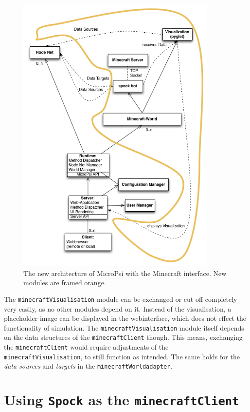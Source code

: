 \begin{figure}[h]
  \centering
    \includegraphics[width=10cm]{graphics/UML_MicroPsi_mit_spock_und_rahmen}
  \caption{The new architecture of MicroPsi with the Minecraft interface. New modules are framed orange.}
  \label{uml_mc}
\end{figure}

The \texttt{minecraftVisualisation} module can be exchanged or cut off completely very easily, as no other modules depend on it. Instead of the visualisation, a placeholder image can be displayed in the webinterface, which does not effect the functionality of simulation. The \texttt{minecraftVisualisation} module itself depends on the data structures of the \texttt{minecraftClient} though. This means, exchanging the \texttt{minecraftClient} would require adjustments of the \texttt{minecraftVisualisation}, to still function as intended. The same holds for the \emph{data sources} and \emph{targets} in the \texttt{minecraftWorldadapter}.

    \section{Using \texttt{Spock} as the \texttt{minecraftClient}}

